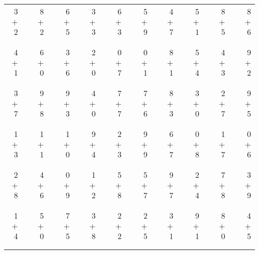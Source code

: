 \documentclass[12pt, letterpaper]{article}
\begin{document}
\begin{tabular}{rrrrrrrrrrrrrrrrrrr}
3 & & 8 & & 6 & & 3 & & 6 & & 5 & & 4 & & 5 & & 8 & & 8\\
$+$ 2 & & $+$ 2 & & $+$ 5 & & $+$ 3 & & $+$ 3 & & $+$ 9 & & $+$ 7 & & $+$ 1 & & $+$ 5 & & $+$ 6\\
\cline{1-1} \cline{3-3} \cline{5-5} \cline{7-7} \cline{9-9} \cline{11-11} \cline{13-13} \cline{15-15} \cline{17-17} \cline{19-19} \\ \\
4 & & 6 & & 3 & & 2 & & 0 & & 0 & & 8 & & 5 & & 4 & & 9\\
$+$ 1 & & $+$ 0 & & $+$ 6 & & $+$ 0 & & $+$ 7 & & $+$ 1 & & $+$ 1 & & $+$ 4 & & $+$ 3 & & $+$ 2\\
\cline{1-1} \cline{3-3} \cline{5-5} \cline{7-7} \cline{9-9} \cline{11-11} \cline{13-13} \cline{15-15} \cline{17-17} \cline{19-19} \\ \\
3 & & 9 & & 9 & & 4 & & 7 & & 7 & & 8 & & 3 & & 2 & & 9\\
$+$ 7 & & $+$ 8 & & $+$ 3 & & $+$ 0 & & $+$ 7 & & $+$ 6 & & $+$ 3 & & $+$ 0 & & $+$ 7 & & $+$ 5\\
\cline{1-1} \cline{3-3} \cline{5-5} \cline{7-7} \cline{9-9} \cline{11-11} \cline{13-13} \cline{15-15} \cline{17-17} \cline{19-19} \\ \\
1 & & 1 & & 1 & & 9 & & 2 & & 9 & & 6 & & 0 & & 1 & & 0\\
$+$ 3 & & $+$ 1 & & $+$ 0 & & $+$ 4 & & $+$ 3 & & $+$ 9 & & $+$ 7 & & $+$ 8 & & $+$ 7 & & $+$ 6\\
\cline{1-1} \cline{3-3} \cline{5-5} \cline{7-7} \cline{9-9} \cline{11-11} \cline{13-13} \cline{15-15} \cline{17-17} \cline{19-19} \\ \\
2 & & 4 & & 0 & & 1 & & 5 & & 5 & & 9 & & 2 & & 7 & & 3\\
$+$ 8 & & $+$ 6 & & $+$ 9 & & $+$ 2 & & $+$ 8 & & $+$ 7 & & $+$ 7 & & $+$ 4 & & $+$ 8 & & $+$ 9\\
\cline{1-1} \cline{3-3} \cline{5-5} \cline{7-7} \cline{9-9} \cline{11-11} \cline{13-13} \cline{15-15} \cline{17-17} \cline{19-19} \\ \\
1 & & 5 & & 7 & & 3 & & 2 & & 2 & & 3 & & 9 & & 8 & & 4\\
$+$ 4 & & $+$ 0 & & $+$ 5 & & $+$ 8 & & $+$ 2 & & $+$ 5 & & $+$ 1 & & $+$ 1 & & $+$ 0 & & $+$ 5\\
\cline{1-1} \cline{3-3} \cline{5-5} \cline{7-7} \cline{9-9} \cline{11-11} \cline{13-13} \cline{15-15} \cline{17-17} \cline{19-19} \\ \\

\end{tabular}
\end{document}
